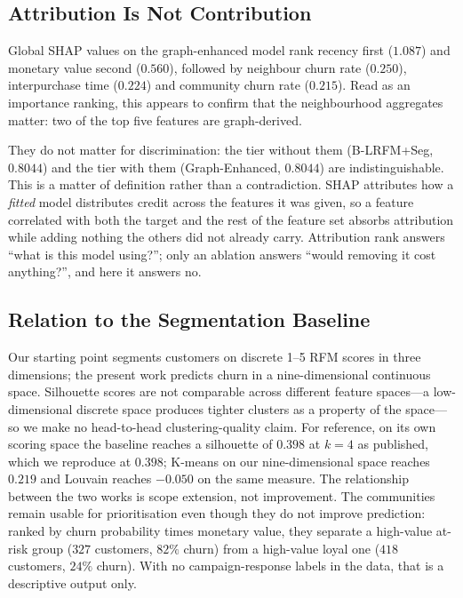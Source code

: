 \documentclass[runningheads]{llncs}
\begin{document}
\subsection{Attribution Is Not Contribution}

Global SHAP values \cite{lundberg2017shap} on the graph-enhanced model rank
recency first ($1.087$) and monetary value second ($0.560$), followed by
neighbour churn rate ($0.250$), interpurchase time ($0.224$) and community churn
rate ($0.215$). Read as an importance ranking, this appears to confirm that the
neighbourhood aggregates matter: two of the top five features are graph-derived.

They do not matter for discrimination: the tier without them (B-LRFM+Seg,
$0.8044$) and the tier with them (Graph-Enhanced, $0.8044$) are
indistinguishable. This is a matter of definition rather than a contradiction.
SHAP attributes how a \emph{fitted} model distributes credit across the features
it was given, so a feature correlated with both the target and the rest of the
feature set absorbs attribution while adding nothing the others did not already
carry. Attribution rank answers ``what is this model using?''; only an ablation
answers ``would removing it cost anything?'', and here it answers no.

\subsection{Relation to the Segmentation Baseline}

Our starting point \cite{viannafilho2026rfm} segments customers on discrete 1--5
RFM scores in three dimensions; the present work predicts churn in a
nine-dimensional continuous space. Silhouette scores are not comparable across
different feature spaces---a low-dimensional discrete space produces tighter
clusters as a property of the space---so we make no head-to-head
clustering-quality claim. For reference, on its own scoring space the baseline
reaches a silhouette of $0.398$ at $k = 4$ as published, which we reproduce at
$0.398$; K-means on our nine-dimensional space reaches $0.219$ and Louvain
reaches $-0.050$ on the same measure. The relationship between the two works is
scope extension, not improvement. The communities remain
usable for prioritisation even though they do not improve prediction: ranked by
churn probability times monetary value, they separate a high-value at-risk group
($327$ customers, $82\%$ churn) from a high-value loyal one ($418$ customers,
$24\%$ churn). With no campaign-response labels in the data, that is a
descriptive output only.
\end{document}
